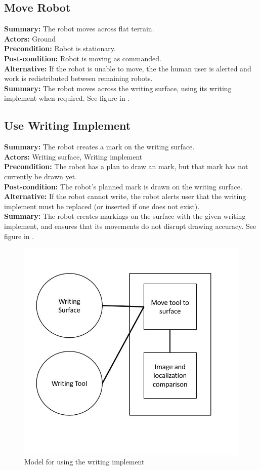 \subsection{Move Robot}
\textbf{Summary:} The robot moves across flat terrain. \\
\textbf{Actors:} Ground \\
\textbf{Precondition:} Robot is stationary. \\
\textbf{Post-condition:} Robot is moving as commanded. \\
\textbf{Alternative:} If the robot is unable to move, the the human user is alerted and work is redistributed between remaining robots. \\
\textbf{Summary:} The robot moves across the writing surface, using its writing implement when required. See figure in .\\

\subsection{Use Writing Implement}
\textbf{Summary:} The robot creates a mark on the writing surface. \\
\textbf{Actors:} Writing surface, Writing implement \\
\textbf{Precondition:} The robot has a plan to draw an mark, but that mark has not currently be drawn yet. \\
\textbf{Post-condition:} The robot's planned mark is drawn on the writing surface. \\
\textbf{Alternative:} If the robot cannot write, the robot alerts user that the writing implement must be replaced (or inserted if one does not exist). \\
\textbf{Summary:} The robot creates markings on the surface with the given writing implement, and ensures that its movements do not disrupt drawing accuracy. See figure in .\\

\begin{figure}
 \centering
  \includegraphics[width=0.48\columnwidth]{figs/use_case-use_writing_implement.jpg}
	 \caption{Model for using the writing implement}
 \label{fig:use_tool}
\end{figure}

